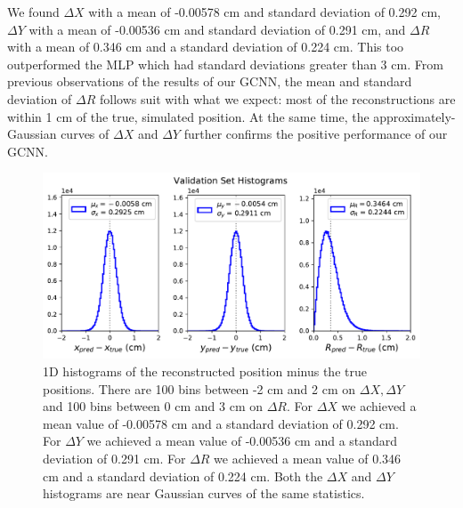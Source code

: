We found $\Delta X$ with a mean of -0.00578 cm and standard deviation of 0.292 cm, $\Delta Y$ with a mean of -0.00536 cm and standard deviation of 0.291 cm, and $\Delta R$ with a mean of 0.346 cm and a standard deviation of 0.224 cm.
This too outperformed the MLP which had standard deviations greater than 3 cm.
From previous observations of the results of our GCNN, the mean and standard deviation of $\Delta R$ follows suit with what we expect: most of the reconstructions are within 1 cm of the true, simulated position.
At the same time, the approximately-Gaussian curves of $\Delta X$ and $\Delta Y$ further confirms the positive performance of our GCNN.
\begin{figure}[t]
	\centering
	\includegraphics[width=0.9\linewidth]{figures/1D_hist_Delaunay-Prenoise.pdf}
	\caption{
	1D histograms of the reconstructed position minus the true positions.
	There are 100 bins between -2 cm and 2 cm on $\Delta X, \Delta Y$ and 100 bins between 0 cm and 3 cm on $\Delta R$.
	For $\Delta X$ we achieved a mean value of -0.00578 cm and a standard deviation of 0.292 cm.
	For $\Delta Y$ we achieved a mean value of -0.00536 cm and a standard deviation of 0.291 cm.
	For $\Delta R$ we achieved a mean value of 0.346 cm and a standard deviation of 0.224 cm.
	Both the $\Delta X$ and $\Delta Y$ histograms are near Gaussian curves of the same statistics.
	}
	\label{fig:1D_Hist}
\end{figure}
